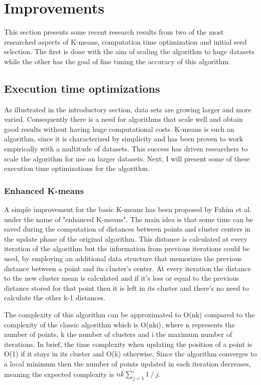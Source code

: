 \documentclass[12pt]{article}
\begin{document}
	\section{Improvements}
	This section presents some recent research results from two of the most researched aspects of K-means, computation time optimization and initial seed selection. The first is done with the aim of scaling the algorithm to huge datasets while the other has the goal of fine tuning the accuracy of this algorithm.
	
	\subsection{Execution time optimizations}
	As illustrated in the introductory section, data sets are growing larger and more varied. Consequently there is a need for algorithms that scale well and obtain good results without having huge computational costs. K-means is such an algorithm, since it is characterized by simplicity and has been proven to work empirically with a multitude of datasets\cite{DataClustering50yearsBeyondKmeans}. This success has driven researchers to scale the algorithm for use on larger datasets. Next, I will present some of these execution time optimizations for the algorithm.
	
	\subsubsection{Enhanced K-means}
	A simple improvement for the basic K-means has been proposed by Fahim et al.\cite{EfficientEnhancedKmeans} under the name of "enhanced K-means". The main idea is that some time can be saved during the computation of distances between points and cluster centers in the update phase of the original algorithm. This distance is calculated at every iteration of the algorithm but the information from previous iterations could be used, by employing an additional data structure that memorizes the previous distance between a point and its cluster's center. At every iteration the distance to the new cluster mean is calculated and if it's less or equal to the previous distance stored for that point then it is left in its cluster and there's no need to calculate the other k-1 distances.
	
	The complexity of this algorithm can be approximated to O(nk) compared to the complexity of the classic algorithm which is O(nki), where n represents the number of points, k the number of clusters and i the maximum number of iterations. In brief, the time complexity when updating the position of a point is O(1) if it stays in its cluster and O(k) otherwise. Since the algorithm converges to a local minimum then the number of points updated in each iteration decreases, meaning the expected complexity is \( nk\sum_{j=1}^{i}1\mathbin{/}j \).
	
\end{document}
